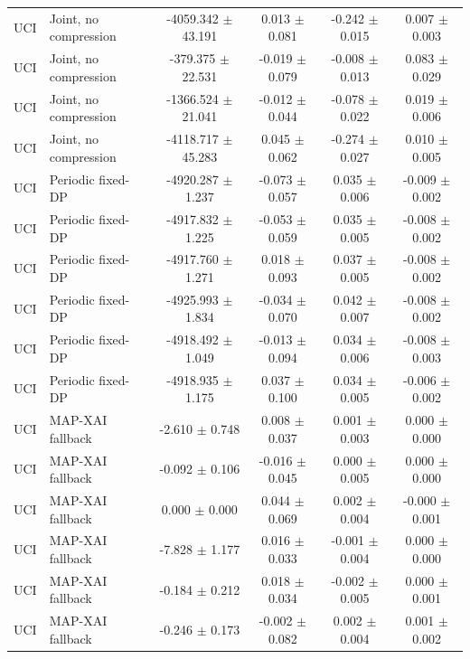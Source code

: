 \begin{table}[t]
\begin{tabular}{llcccc}
UCI & Joint, no compression & -4059.342 $\pm$ 43.191 & 0.013 $\pm$ 0.081 & -0.242 $\pm$ 0.015 & 0.007 $\pm$ 0.003 \\
UCI & Joint, no compression & -379.375 $\pm$ 22.531 & -0.019 $\pm$ 0.079 & -0.008 $\pm$ 0.013 & 0.083 $\pm$ 0.029 \\
UCI & Joint, no compression & -1366.524 $\pm$ 21.041 & -0.012 $\pm$ 0.044 & -0.078 $\pm$ 0.022 & 0.019 $\pm$ 0.006 \\
UCI & Joint, no compression & -4118.717 $\pm$ 45.283 & 0.045 $\pm$ 0.062 & -0.274 $\pm$ 0.027 & 0.010 $\pm$ 0.005 \\
UCI & Periodic fixed-DP & -4920.287 $\pm$ 1.237 & -0.073 $\pm$ 0.057 & 0.035 $\pm$ 0.006 & -0.009 $\pm$ 0.002 \\
UCI & Periodic fixed-DP & -4917.832 $\pm$ 1.225 & -0.053 $\pm$ 0.059 & 0.035 $\pm$ 0.005 & -0.008 $\pm$ 0.002 \\
UCI & Periodic fixed-DP & -4917.760 $\pm$ 1.271 & 0.018 $\pm$ 0.093 & 0.037 $\pm$ 0.005 & -0.008 $\pm$ 0.002 \\
UCI & Periodic fixed-DP & -4925.993 $\pm$ 1.834 & -0.034 $\pm$ 0.070 & 0.042 $\pm$ 0.007 & -0.008 $\pm$ 0.002 \\
UCI & Periodic fixed-DP & -4918.492 $\pm$ 1.049 & -0.013 $\pm$ 0.094 & 0.034 $\pm$ 0.006 & -0.008 $\pm$ 0.003 \\
UCI & Periodic fixed-DP & -4918.935 $\pm$ 1.175 & 0.037 $\pm$ 0.100 & 0.034 $\pm$ 0.005 & -0.006 $\pm$ 0.002 \\
UCI & MAP-XAI fallback & -2.610 $\pm$ 0.748 & 0.008 $\pm$ 0.037 & 0.001 $\pm$ 0.003 & 0.000 $\pm$ 0.000 \\
UCI & MAP-XAI fallback & -0.092 $\pm$ 0.106 & -0.016 $\pm$ 0.045 & 0.000 $\pm$ 0.005 & 0.000 $\pm$ 0.000 \\
UCI & MAP-XAI fallback & 0.000 $\pm$ 0.000 & 0.044 $\pm$ 0.069 & 0.002 $\pm$ 0.004 & -0.000 $\pm$ 0.001 \\
UCI & MAP-XAI fallback & -7.828 $\pm$ 1.177 & 0.016 $\pm$ 0.033 & -0.001 $\pm$ 0.004 & 0.000 $\pm$ 0.000 \\
UCI & MAP-XAI fallback & -0.184 $\pm$ 0.212 & 0.018 $\pm$ 0.034 & -0.002 $\pm$ 0.005 & 0.000 $\pm$ 0.001 \\
UCI & MAP-XAI fallback & -0.246 $\pm$ 0.173 & -0.002 $\pm$ 0.082 & 0.002 $\pm$ 0.004 & 0.001 $\pm$ 0.002 \\
\bottomrule
\end{tabular}
\end{table}
